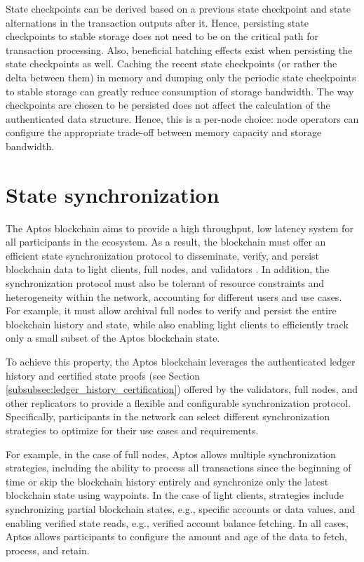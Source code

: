 \documentclass{article}
\begin{document}
State checkpoints can be derived based on a previous state checkpoint and state alternations in the transaction outputs after it. Hence, persisting state checkpoints to stable storage does not need to be on the critical path for transaction processing. Also, beneficial batching effects exist when persisting the state checkpoints as well. Caching the recent state checkpoints (or rather the delta between them) in memory and dumping only the periodic state checkpoints to stable storage can greatly reduce consumption of storage bandwidth. The way checkpoints are chosen to be persisted does not affect the calculation of the authenticated data structure. Hence, this is a per-node choice: node operators can configure the appropriate trade-off between memory capacity and storage bandwidth.

\section{State synchronization}
\label{sub:state_sync}

The Aptos blockchain aims to provide a high throughput, low latency system for all participants in the ecosystem. As a result, the blockchain must offer an efficient state synchronization protocol to disseminate, verify, and persist blockchain data to light clients, full nodes, and validators \cite{evolution_state_sync}. In addition, the synchronization protocol must also be tolerant of resource constraints and heterogeneity within the network, accounting for different users and use cases. For example, it must allow archival full nodes to verify and persist the entire blockchain history and state, while also enabling light clients to efficiently track only a small subset of the Aptos blockchain state.

To achieve this property, the Aptos blockchain leverages the authenticated ledger history and certified state proofs (see Section \ref{subsubsec:ledger_history_certification}) offered by the validators, full nodes, and other replicators to provide a flexible and configurable synchronization protocol. Specifically, participants in the network can select different synchronization strategies to optimize for their use cases and requirements.

For example, in the case of full nodes, Aptos allows multiple synchronization strategies, including the ability to process all transactions since the beginning of time or skip the blockchain history entirely and synchronize only the latest blockchain state using waypoints. In the case of light clients, strategies include synchronizing partial blockchain states, e.g., specific accounts or data values, and enabling verified state reads, e.g., verified account balance fetching. In all cases, Aptos allows participants to configure the amount and age of the data to fetch, process, and retain.   
\end{document}

